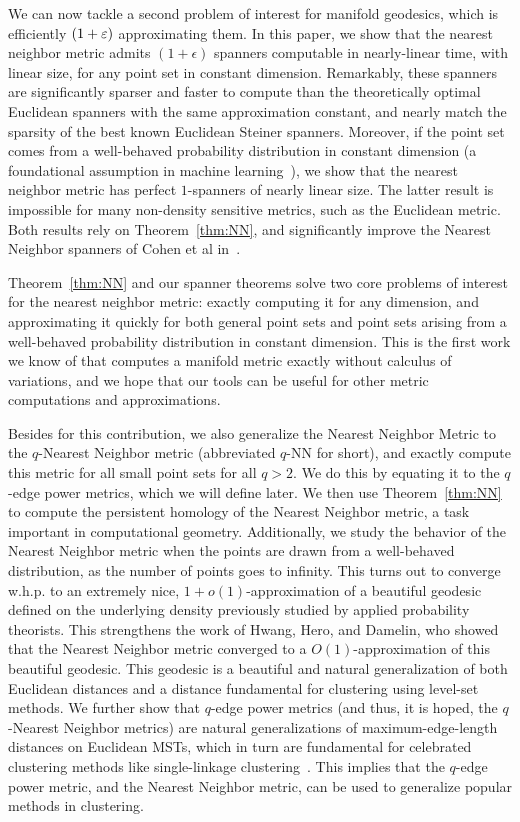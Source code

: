 We can now tackle a second problem of interest for manifold geodesics,
which is efficiently $(1+\varepsilon)$ approximating them. In this paper, we show
that the nearest neighbor metric admits $(1+\epsilon)$ spanners computable
in nearly-linear time, with linear size, for any point set in constant
dimension. Remarkably, these spanners are significantly sparser and faster
to compute than the theoretically optimal Euclidean spanners with the same
approximation constant, and nearly match the sparsity of the best known
Euclidean Steiner spanners. Moreover, if the point set comes from a
well-behaved probability distribution in constant dimension (a foundational
assumption in machine learning~\cite{}), we show that the nearest neighbor
metric has perfect $1$-spanners of nearly linear size. The latter result is
impossible for many non-density sensitive metrics, such as the Euclidean
metric. Both results rely on Theorem~\ref{thm:NN}, and significantly
improve the Nearest Neighbor spanners of Cohen et al in~\cite{}.

Theorem~\ref{thm:NN} and our spanner theorems solve two core problems of
interest for the nearest neighbor metric: exactly computing it for any
dimension, and approximating it quickly for both general point sets and
point sets arising from a well-behaved probability distribution in constant
dimension. This is the first work we know of that computes a manifold
metric exactly without calculus of variations, and we hope that our tools
can be useful for other metric computations and approximations. 

Besides for this contribution, we also generalize the Nearest Neighbor
Metric to the $q$-Nearest Neighbor metric (abbreviated $q$-NN for short),
and exactly compute this metric for all small point sets for all $q>2$. We
do this by equating it to the $q$-edge power metrics, which we will define
later. We then use Theorem~\ref{thm:NN} to compute the persistent homology
of the Nearest Neighbor metric, a task important in computational geometry.
Additionally, we study the behavior of the Nearest Neighbor metric when the
points are drawn from a well-behaved distribution, as the number of points
goes to infinity. This turns out to converge w.h.p. to an extremely nice,
$1+o(1)$-approximation of a beautiful geodesic defined on the underlying
density previously studied by applied probability theorists. This
strengthens the work of Hwang, Hero, and Damelin, who showed that the
Nearest Neighbor metric converged to a $O(1)$-approximation of this
beautiful geodesic. This geodesic is a beautiful and natural generalization
of both Euclidean distances and a distance fundamental for clustering using
level-set methods. We further show that $q$-edge power metrics (and thus,
it is hoped, the $q$-Nearest Neighbor metrics) are natural generalizations
of maximum-edge-length distances on Euclidean MSTs, which in turn are
fundamental for celebrated clustering methods like single-linkage
clustering~\cite{}. This implies that the $q$-edge power metric, and the
Nearest Neighbor metric, can be used to generalize popular methods in
clustering.

